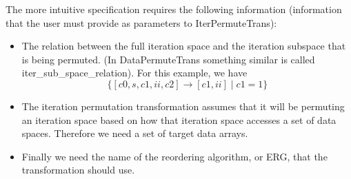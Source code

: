 \documentclass{article}
\begin{document}
The more intuitive specification requires the following information (information that the user must provide as parameters to IterPermuteTrans):
\begin{itemize}
\item The relation between the full iteration space and the iteration subspace that is being permuted. (In DataPermuteTrans something similar is called iter\_sub\_space\_relation).
For this example, we have
\[
\{ [c0, s, c1, ii, c2 ] \rightarrow [ c1, ii] \; | \; c1 = 1 \}
\]

\item The iteration permutation transformation assumes that it will be permuting an iteration space based on how that iteration space accesses a set of data spaces.  Therefore we need a set of target data arrays.
\item Finally we need the name of the reordering algorithm, or ERG, that the transformation should use.
\end{itemize}
    
    
%    
%            

%    		
%            
%            
%            
\end{document}
